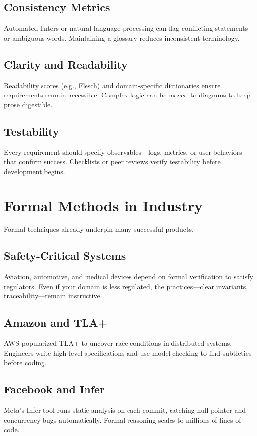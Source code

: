 \subsection{Consistency Metrics}
Automated linters or natural language processing can flag conflicting statements or ambiguous words. Maintaining a glossary reduces inconsistent terminology.

\subsection{Clarity and Readability}
Readability scores (e.g., Flesch) and domain-specific dictionaries ensure requirements remain accessible. Complex logic can be moved to diagrams to keep prose digestible.

\subsection{Testability}
Every requirement should specify observables—logs, metrics, or user behaviors—that confirm success. Checklists or peer reviews verify testability before development begins.

\section{Formal Methods in Industry}
\label{sec:math-industry}

Formal techniques already underpin many successful products.

\subsection{Safety-Critical Systems}
Aviation, automotive, and medical devices depend on formal verification to satisfy regulators. Even if your domain is less regulated, the practices—clear invariants, traceability—remain instructive.

\subsection{Amazon and TLA+}
AWS popularized TLA+ to uncover race conditions in distributed systems. Engineers write high-level specifications and use model checking to find subtleties before coding.

\subsection{Facebook and Infer}
Meta's Infer tool runs static analysis on each commit, catching null-pointer and concurrency bugs automatically. Formal reasoning scales to millions of lines of code.

